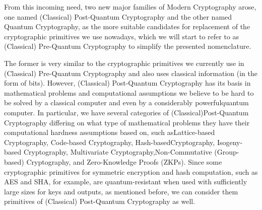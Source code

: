 \documentclass[runningheads]{llncs}
\numberwithin{equation}{section}
\begin{document}
    From this incoming need, two new major families of Modern Cryptography arose, one named (Classical) Post-Quantum Cryptography and the other named Quantum Cryptography, as the more suitable candidates for replacement of the cryptographic primitives we use nowadays, which we will start to refer to as (Classical) Pre-Quantum Cryptography to simplify the presented nomenclature.    
    
    The former is very similar to the cryptographic primitives we currently use in (Classical) Pre-Quantum Cryptography and also uses classical information (in the form of bits). However, (Classical) Post-Quantum Cryptography has its basis in mathematical problems and computational assumptions we believe to be hard to be solved by a classical computer and even by a considerably powerful\break quantum computer. In particular, we have several categories of (Classical)\break Post-Quantum Cryptography differing on what type of mathematical problems they have their computational hardness assumptions based on, such as\break Lattice-based Cryptography, Code-based Cryptography, Hash-based\break Cryptography, Isogeny-based Cryptography, Multivariate Cryptography,\break Non-Commutative (Group-based) Cryptography, and Zero-Knowledge Proofs (ZKPs). Since some cryptographic primitives for symmetric encryption and hash computation, such as AES and SHA, for example, are quantum-resistant when used with sufficiently large sizes for keys and outputs, as mentioned before, we can consider them primitives of (Classical) Post-Quantum Cryptography as well.
\end{document}
